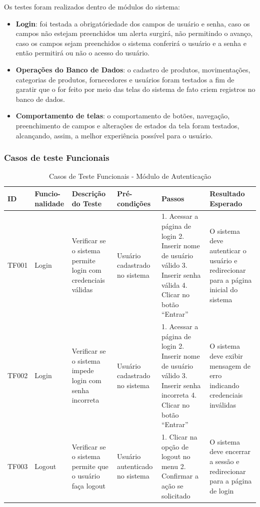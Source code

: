 \documentclass[
	12pt,				%
	openany,			%
	twoside,			%
	a4paper,			%
	english,			%
	brazil				%
	]{abntex2}
\begin{document}
Os testes foram realizados dentro de módulos do sistema:

\begin{itemize}
    \item \textbf{Login}: foi testada a obrigatóriedade dos campos de usuário e senha, caso os campos não estejam preenchidos um alerta surgirá, não permitindo o avanço, caso os campos sejam preenchidos o sistema conferirá o usuário e a senha e então permitirá ou não o acesso do usuário.
    \item \textbf{Operações do Banco de Dados}: o cadastro de produtos, movimentações, categorias de produtos, fornecedores e usuários foram testados a fim de garatir que o for feito por meio das telas do sistema de fato criem registros no banco de dados.
    \item \textbf{Comportamento de telas}: o comportamento de botões, navegação, preenchimento de campos e alterações de estados da tela foram testados, alcançando, assim, a melhor experiência possível para o usuário.
\end{itemize}

\newpage

\subsubsection{Casos de teste Funcionais}
\begin{table}[htbp]

\caption{Casos de Teste Funcionais - Módulo de Autenticação}
\begin{tabular}{|p{1cm}|p{1.6cm}|p{3.3cm}|p{2.3cm}|p{3.5cm}|p{3.5cm}|}
\hline
\textbf{ID} & \textbf{Funcio-nalidade} & \textbf{Descrição do Teste} & \textbf{Pré-condições} & \textbf{Passos} & \textbf{Resultado Esperado} \\
\hline
TF001 & Login & Verificar se o sistema permite login com credenciais válidas & Usuário cadastrado no sistema & 
1. Acessar a página de login
2. Inserir nome de usuário válido
3. Inserir senha válida
4. Clicar no botão ``Entrar'' & 
O sistema deve autenticar o usuário e redirecionar para a página inicial do sistema \\
\hline
TF002 & Login & Verificar se o sistema impede login com senha incorreta & Usuário cadastrado no sistema & 
1. Acessar a página de login
2. Inserir nome de usuário válido
3. Inserir senha incorreta
4. Clicar no botão ``Entrar'' & 
O sistema deve exibir mensagem de erro indicando credenciais inválidas \\
\hline
TF003 & Logout & Verificar se o sistema permite que o usuário faça logout & Usuário autenticado no sistema & 
1. Clicar na opção de logout no menu
2. Confirmar a ação se solicitado & 
O sistema deve encerrar a sessão e redirecionar para a página de login \\
\hline
\end{tabular}
\end{table}
\end{document}
